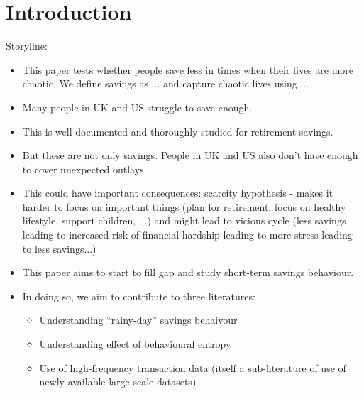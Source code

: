 
\section{Introduction}%
\label{sec:introduction}

Storyline:
\begin{itemize}

    \item This paper tests whether people save less in times when their lives
        are more chaotic. We define savings as ... and capture chaotic lives
        using ...

    \item Many people in UK and US struggle to save
        enough.

    \item This is well documented and thoroughly studied for retirement
        savings.

    \item But these are not only savings. People in UK and US also don't have
        enough to cover unexpected outlays.

    \item This could have important consequences: scarcity hypothesis - makes
        it harder to focus on important things (plan for retirement, focus on
        healthy lifestyle, support children, ...) and might lead to vicious
        cycle (less savings leading to increased risk of financial hardship
        leading to more stress leading to less savings...)

    \item This paper aims to start to fill gap and study short-term savings
        behaviour.

    \item In doing so, we aim to contribute to three literatures:

    \begin{itemize}
        \item Understanding ``rainy-day'' savings behaivour

        \item Understanding effect of behavioural entropy

        \item Use of high-frequency transaction data (itself a sub-literature of
            use of newly available large-scale datasets)
    \end{itemize}
\end{itemize}


